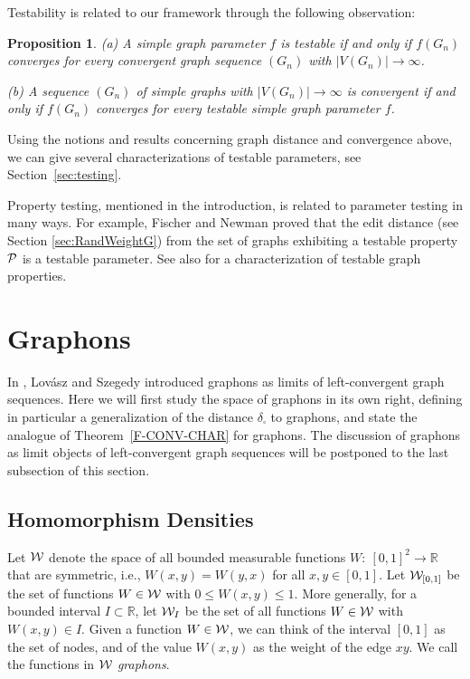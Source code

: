 \documentclass[12pt]{article}
\newtheorem{prop}[theorem]{Proposition}
\numberwithin{equation}{section}
\def\R{{\mathbb R}}
\def\PP{{\cal P}}\def\QQ{{\cal Q}}\def\RR{{\cal R}}
\def\WWz{{\WW_{[0,1]}}}
\begin{document}
Testability is related to our framework through the following
observation:

\begin{prop}\label{thm:TESTABLE-PAR}
{\rm (a)} A simple graph parameter $f$ is testable if and only if
$f(G_n)$ converges for every convergent graph sequence $(G_n)$ with
$|V(G_n)|\to\infty$.

\smallskip

{\rm (b)} A sequence $(G_n)$ of simple graphs with
$|V(G_n)|\to\infty$ is convergent if and only if $f(G_n)$ converges
for every testable simple graph parameter $f$.
\end{prop}

Using the notions and results concerning graph distance and
convergence above, we can give several characterizations of testable
parameters, see Section~\ref{sec:testing}.

Property testing, mentioned in the introduction, is related
to parameter testing in many ways. For example, Fischer and Newman
\cite{FN} proved that the edit distance (see Section
\ref{sec:RandWeightG}) from the set of graphs exhibiting a testable
property $\PP$ is a testable parameter. See also \cite{AFNS} for a
characterization of testable graph properties.


\section{Graphons} \label{sec:graphon}

In \cite{LSz1}, Lov\'asz and Szegedy introduced graphons as limits of
left-convergent graph sequences. Here we will first study the space
of graphons in its own right, defining in particular a generalization
of the distance $\delta_\square$ to graphons, and state the analogue
of Theorem~\ref{F-CONV-CHAR} for graphons. The discussion of graphons
as limit objects of left-convergent graph sequences will be postponed
to the last subsection of this section.

\subsection{Homomorphism Densities}
\label{sec:results-conv}

Let ${\cal W}$ denote the space of all bounded measurable functions
$W:~[0,1]^2\to\R$ that are symmetric, i.e., $W(x,y)=W(y,x)$ for all
$x,y\in[0,1]$. Let {$\WWz$} be the set of functions $W\in{\cal W}$ with
$0\le W(x,y)\le 1$. More generally, for a bounded interval
$I\subset\R$, let ${\cal W}_I$ be the set of all functions $W\in{\cal W}$ with
$W(x,y)\in I$. Given a function $W\in{\cal W}$, we can think of the
interval $[0,1]$ as the set of nodes, and of the value $W(x,y)$ as
the weight of the edge $xy$.  We call the functions in ${\cal W}$ {\it
graphons}.
\end{document}
